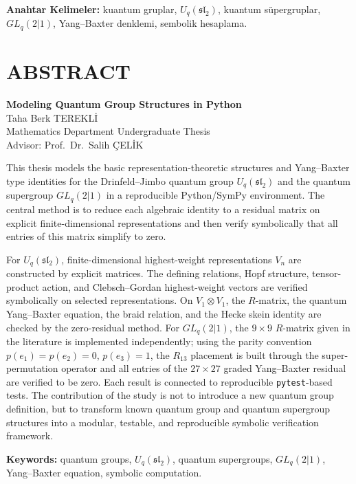 \documentclass[12pt,a4paper,fleqn]{report}
\newcommand{\normalsemi}{;}
\newcommand{\normalsemi}{\begingroup\semicolonfont;\endgroup}
\numberwithin{equation}{chapter}
\theoremstyle{plain}
\theoremstyle{definition}
\renewcommand{\sl}{\mathfrak{sl}}
\newcommand{\Uq}{U_q(\sl_2)}
\newcommand{\TezBaslikEn}{Modeling Quantum Group Structures in Python}
\newcommand{\Ogrenci}{Taha Berk TEREKLİ}
\newcommand{\Danisman}{Prof.\ Dr.\ Salih ÇELİK}
\begin{document}
\vspace{0.6cm}
\noindent\textbf{Anahtar Kelimeler:} kuantum gruplar, $U_q(\mathfrak{sl}_2)$,
kuantum süpergruplar, $GL_q(2|1)$, Yang--Baxter denklemi, sembolik hesaplama.
\clearpage

\chapter*{ABSTRACT}
\begin{center}
{\bfseries \TezBaslikEn}\\[4pt]
\Ogrenci\\[8pt]
Mathematics Department Undergraduate Thesis\\[6pt]
Advisor: \Danisman\\[10pt]
\end{center}

This thesis models the basic representation-theoretic structures and
Yang--Baxter type identities for the Drinfeld--Jimbo quantum group $\Uq$ and the
quantum supergroup $GL_q(2|1)$ in a reproducible Python/SymPy environment. The
central method is to reduce each algebraic identity to a residual matrix on
explicit finite-dimensional representations and then verify symbolically that
all entries of this matrix simplify to zero.

For $\Uq$, finite-dimensional highest-weight representations $V_n$ are
constructed by explicit matrices. The defining relations, Hopf structure,
tensor-product action, and Clebsch--Gordan highest-weight vectors are verified
symbolically on selected representations. On $V_1\otimes V_1$, the $R$-matrix,
the quantum Yang--Baxter equation, the braid relation, and the Hecke skein
identity are checked by the zero-residual method. For $GL_q(2|1)$, the
$9\times9$ $R$-matrix given in the literature is implemented independently\normalsemi{}
using the parity convention $p(e_1)=p(e_2)=0$, $p(e_3)=1$, the $R_{13}$
placement is built through the super-permutation operator and all entries of the
$27\times27$ graded Yang--Baxter residual are verified to be zero. Each result is
connected to reproducible \texttt{pytest}-based tests. The contribution of the
study is not to introduce a new quantum group definition, but to transform known
quantum group and quantum supergroup structures into a modular, testable, and
reproducible symbolic verification framework.

\vspace{0.6cm}
\noindent\textbf{Keywords:} quantum groups, $U_q(\mathfrak{sl}_2)$, quantum
supergroups, $GL_q(2|1)$, Yang--Baxter equation, symbolic computation.
\clearpage
\end{document}
